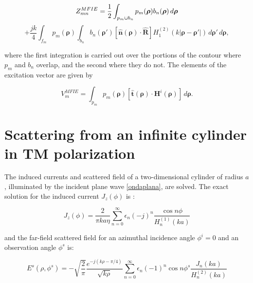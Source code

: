 \documentclass[11pt,a4paper,twoside,pdf]{article}
\numberwithin{equation}{section}
\begin{document}
\begin{equation}
    Z^{MFIE}_{mn}
=
\frac{1}{2}
\int_{p_m \cup b_n}
p_m(\boldsymbol{\rho}) b_n(\boldsymbol{\rho}) \, d\boldsymbol{\rho}
\notag
\end{equation}
\begin{equation}
+
\frac{j k}{4}
\int_{f_m}
p_m(\boldsymbol{\rho})
\int_{b_n}
b_n(\boldsymbol{\rho}')
\left[
\hat{\mathbf{n}}(\boldsymbol{\rho}) \cdot \hat{\mathbf{R}}
\right]
H_1^{(2)}\!\left( k \lvert \boldsymbol{\rho} - \boldsymbol{\rho}' \rvert \right)
\, d\boldsymbol{\rho}'
\, d\boldsymbol{\rho},
\label{ZMFIE}
\end{equation}


where the first integration is carried out over the portions of the contour where $p_m$ and $b_n$ overlap, and the second where they do not.
The elements of the excitation vector are given by

\begin{equation}
V^{MFIE}_m
=
\int_{p_m}
p_m(\boldsymbol{\rho})
\left[
\hat{\mathbf{t}}(\boldsymbol{\rho}) \cdot \mathbf{H}^i(\boldsymbol{\rho})
\right]
\, d\boldsymbol{\rho}.
\end{equation}




\section{Scattering from an infinite cylinder in TM polarization}



The induced currents and scattered field of a two-dimensional cylinder of radius $a$, illuminated by the incident plane wave \ref{ondaplana}, are solved. The exact solution for the induced current $J_z(\phi)$ is \cite{ruck1970radar}:

\begin{equation}
J_z(\phi)
=
\frac{2}{\pi k a \eta}
\sum_{n=0}^{\infty}
\epsilon_n (-j)^n
\frac{\cos n\phi}{H_n^{(1)}(k a)}
\label{Jexacta}
\end{equation}

and the far-field scattered field for an azimuthal incidence angle $\phi^i = 0$ and an observation angle $\phi^s$ is:

\begin{equation}
E^s(\rho, \phi^s)
=
-
\sqrt{\frac{2}{\pi}}
\frac{e^{-j (k \rho - \pi/4)}}{\sqrt{k \rho}}
\sum_{n=0}^{\infty}
\epsilon_n (-1)^n
\cos n\phi^s
\frac{J_n(k a)}{H_n^{(2)}(k a)}
\label{Eexacto}
\end{equation}
\end{document}
